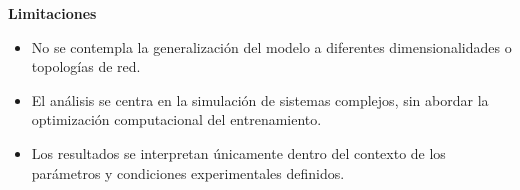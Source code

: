 \textbf{Limitaciones}

\begin{itemize}
	
	\item No se contempla la generalización del modelo a diferentes dimensionalidades o topologías de red.
	
	\item El análisis se centra en la simulación de sistemas complejos, sin abordar la optimización computacional del entrenamiento.
	
	\item Los resultados se interpretan únicamente dentro del contexto de los parámetros y condiciones experimentales definidos.
	
\end{itemize}

